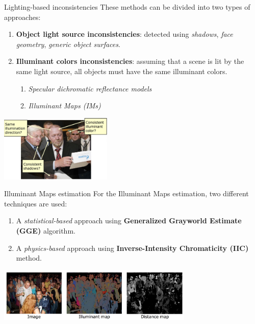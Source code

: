 \begin{tframe}{Lighting-based inconsistencies}
\vspace{0.1cm}
These methods can be divided into two types of approaches:
\vspace{0.2cm}
\begin{enumerate}
\item \textbf{Object light source inconsistencies}: detected using \emph{shadows}, \emph{face geometry}, \emph{generic object surfaces}.
\vspace{0.2cm}

\item \textbf{Illuminant colors inconsistencies}: {\small assuming that a scene is lit by the same light source, all objects must have the same illuminant colors.}
\vspace{0.2cm}
\begin{enumerate}
\item \textit{Specular dichromatic reflectance models}
\vspace{0.1cm}
\item \textit{Illuminant Maps (IMs)}
\end{enumerate}
\end{enumerate}
\begin{center}
\includegraphics[width=0.4\textwidth]{images/lighting-based.jpg}
\end{center}
\end{tframe}


\begin{tframe}{Illuminant Maps estimation}
\vspace{0.2cm}
For the Illuminant Maps estimation, two different techniques are used: 
\vspace{0.3cm}
\begin{enumerate}
\item A \emph{statistical-based} approach using \textbf{Generalized Grayworld Estimate (GGE)} algorithm.
\vspace{0.2cm}
\item A \emph{physics-based} approach using \textbf{Inverse-Intensity Chromaticity (IIC)} method.
\end{enumerate}

\begin{center}
\includegraphics[width=0.7\textwidth]{images/riess.jpg}
\end{center}
\end{tframe}


